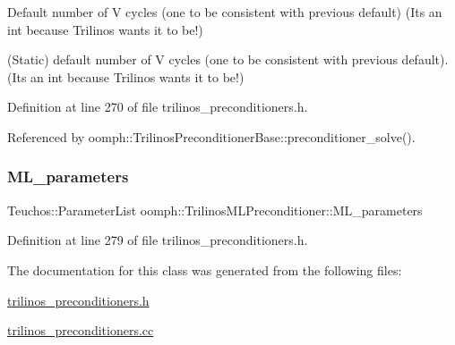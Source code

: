 Default number of V cycles (one to be consistent with previous default) (It\textquotesingle{}s an int because Trilinos wants it to be!) 

(Static) default number of V cycles (one to be consistent with previous default). (It\textquotesingle{}s an int because Trilinos wants it to be!) 

Definition at line 270 of file trilinos\+\_\+preconditioners.\+h.



Referenced by oomph\+::\+Trilinos\+Preconditioner\+Base\+::preconditioner\+\_\+solve().

\mbox{\label{classoomph_1_1TrilinosMLPreconditioner_aa324e487780da0351288965209253e74}} 
\subsubsection{\texorpdfstring{M\+L\+\_\+parameters}{ML\_parameters}}
{\footnotesize\ttfamily Teuchos\+::\+Parameter\+List oomph\+::\+Trilinos\+M\+L\+Preconditioner\+::\+M\+L\+\_\+parameters\hspace{0.3cm}{\ttfamily [protected]}}



Definition at line 279 of file trilinos\+\_\+preconditioners.\+h.



The documentation for this class was generated from the following files\+:\begin{DoxyCompactItemize}
\item 
\hyperlink{trilinos__preconditioners_8h}{trilinos\+\_\+preconditioners.\+h}\item 
\hyperlink{trilinos__preconditioners_8cc}{trilinos\+\_\+preconditioners.\+cc}\end{DoxyCompactItemize}
